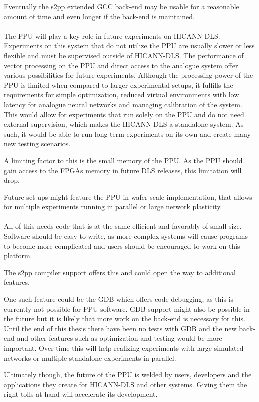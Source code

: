 Eventually the s2pp extended GCC back-end may be usable for a reasonable amount of time and even longer if the back-end is maintained.
\\
\\
The \ac{PPU} will play a key role in future experiments on \ac{HICANN-DLS}.
Experiments on this system that do not utilize the \ac{PPU} are usually slower or less flexible and must be supervised outside of \ac{HICANN-DLS}.
The performance of vector processing on the \ac{PPU} and direct access to the analogue system offer various possibilities for future experiments.
Although the processing power of the \ac{PPU} is limited when compared to larger experimental setups, it fulfills the requirements for simple optimization, reduced virtual environments with low latency for analogue neural networks and managing calibration of the system.
This would allow for experiments that run solely on the \ac{PPU} and do not need external supervision, which makes the \ac{HICANN-DLS} a standalone system.
As such, it would be able to run long-term experiments on its own and create many new testing scenarios.

A limiting factor to this is the small memory of the \ac{PPU}.
As the \ac{PPU} should gain access to the FPGAs memory in future DLS releases, this limitation will drop.

Future set-ups might feature the \ac{PPU} in wafer-scale implementation, that allows for multiple experiments running in parallel or large network plasticity.
\\
\\
All of this needs code that is at the same efficient and favorably of small size.
Software should be easy to write, as more complex systems will cause programs to become more complicated and users should be encouraged to work on this platform.

The s2pp compiler support offers this and could open the way to additional features.

One such feature could be the \ac{GDB} which offers code debugging, as this is currently not possible for \ac{PPU} software.
\ac{GDB} support might also be possible in the future but it is likely that more work on the back-end is necessary for this.
Until the end of this thesis there have been no tests with \ac{GDB} and the new back-end and other features such as optimization and testing would be more important.
Over time this will help realizing experiments with large simulated networks or multiple standalone experiments in parallel.

Ultimately though, the future of the \ac{PPU} is welded by users, developers and the applications they create for \ac{HICANN-DLS} and other systems.
Giving them the right tolls at hand will accelerate its development.

